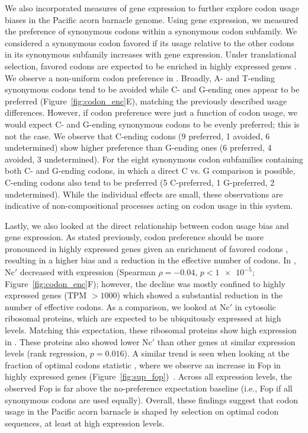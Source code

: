 We also incorporated measures of gene expression to further explore codon usage biases in
the Pacific acorn barnacle genome.
Using gene expression, we measured the preference of synonymous codons within a synonymous
codon subfamily.
We considered a synonymous codon favored if its usage relative to the other codons in its
synonymous subfamily increases with gene expression.
Under translational selection, favored codons are expected to be enriched in highly expressed
genes \citep{duret_1999_codons}.
We observe a non-uniform codon preference in \bgla{}.
Broadly, A- and T-ending synonymous codons tend to be avoided while C- and G-ending ones
appear to be preferred (Figure~\ref{fig:codon_enc}E), matching the previously described
usage differences.
However, if codon preference were just a function of codon usage, we would expect C- and
G-ending synonymous codons to be evenly preferred; this is not the case.
We observe that C-ending codons (9 preferred, 1 avoided, 6 undetermined) show higher
preference than G-ending ones (6 preferred, 4 avoided, 3 undetermined).
For the eight synonymous codon subfamilies containing both C- and G-ending codons, in
which a direct C vs. G comparison is possible, C-ending codons also tend to be preferred
(5 C-preferred, 1 G-preferred, 2 undetermined).
While the individual effects are small, these observations are indicative of
non-compositional processes acting on codon usage in this system.
\vspace{0.1cm}

Lastly, we also looked at the direct relationship between codon usage bias and gene expression.
As stated previously, codon preference should be more pronounced in highly expressed genes
given an enrichment of favored codons \citep{duret_1999_codons}, resulting in a higher bias and
a reduction in the effective number of codons.
In \bgla{}, Nc$'$ decreased with expression (Spearman $\rho=-0.04$, $p<\num{1e-5}$; Figure~\ref{fig:codon_enc}F);
however, the decline was mostly confined to highly expressed genes (TPM $>1000$) which showed
a substantial reduction in the number of effective codons.
As a comparison, we looked at Nc$'$ in cytosolic ribosomal proteins, which are expected to be
ubiquitously expressed at high levels.
Matching this expectation, these ribosomal proteins show high expression in \bgla{}.
These proteins also showed lower Nc$'$ than other genes at similar expression levels (rank
regression, $p = 0.016$).
A similar trend is seen when looking at the fraction of optimal codons statistic \citep[Fop;][]{ikemura_1981_codons}, where we observe an increase in Fop in highly expressed genes (Figure~\ref{fig:sup_fop})~.
Across all expression levels, the observed Fop is far above the no-preference expectation baseline
(i.e., Fop if all synonymous codons are used equally).
Overall, these findings suggest that codon usage in the Pacific acorn barnacle is shaped by
selection on optimal codon sequences, at least at high expression levels.

